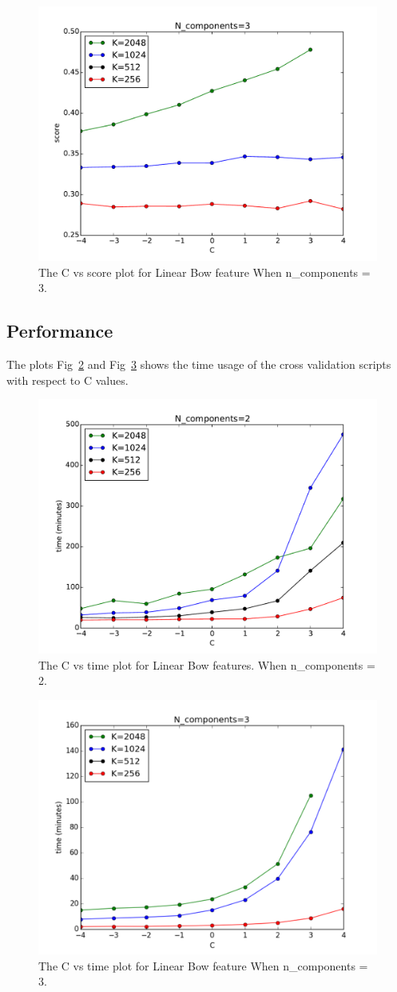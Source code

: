 \documentclass[final,leqno,onefignum,onetabnum]{siamltexmm}
\begin{document}
\begin{figure}
  \centering
  \includegraphics[width=0.60\linewidth]{images/score3Components}
  \caption{The C vs score plot for Linear Bow feature When n\_components = 3.\label{fig:bowf_score3}}
\end{figure}

\subsection{Performance}
The plots Fig~\ref{fig:bowf_time2} and Fig~\ref{fig:bowf_time3} shows the time usage of the cross validation scripts with respect to C values.
\begin{figure}
  \centering
  \includegraphics[width=0.60\linewidth]{images/time2Components}
  \caption{The C vs time plot for Linear Bow features. When n\_components = 2.\label{fig:bowf_time2}}
\end{figure}

\begin{figure}
  \centering
  \includegraphics[width=0.60\linewidth]{images/time3Components}
  \caption{The C vs time plot for Linear Bow feature When n\_components = 3.\label{fig:bowf_time3}}
\end{figure}
\end{document}
